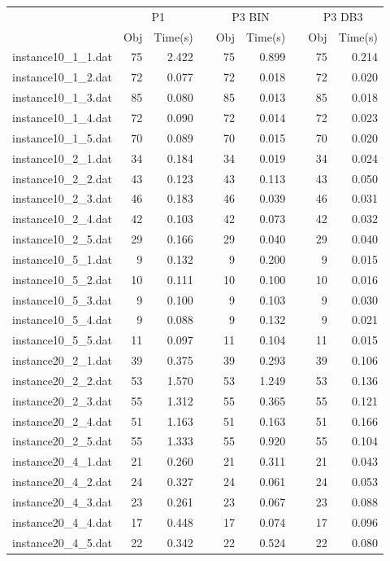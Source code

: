 \begin{table}[h!]\centering
{}
\begin{tabular}{@{}rrrcrrcrr@{}}\toprule
& \multicolumn{2}{c}{P1} & \phantom{abc} & \multicolumn{2}{c}{P3 BIN} & \phantom{abc} & \multicolumn{2}{c}{P3 DB3}\\
\cmidrule{2-3} \cmidrule{5-6} \cmidrule{8-9}
& Obj & Time(s) & & Obj & Time(s) & & Obj & Time(s)\\ \midrule
instance10\_1\_1.dat & 75 & 2.422 & & 75 & 0.899 & & 75 & 0.214 \\
instance10\_1\_2.dat & 72 & 0.077 & & 72 & 0.018 & & 72 & 0.020 \\
instance10\_1\_3.dat & 85 & 0.080 & & 85 & 0.013 & & 85 & 0.018 \\
instance10\_1\_4.dat & 72 & 0.090 & & 72 & 0.014 & & 72 & 0.023 \\
instance10\_1\_5.dat & 70 & 0.089 & & 70 & 0.015 & & 70 & 0.020 \\
instance10\_2\_1.dat & 34 & 0.184 & & 34 & 0.019 & & 34 & 0.024 \\
instance10\_2\_2.dat & 43 & 0.123 & & 43 & 0.113 & & 43 & 0.050 \\
instance10\_2\_3.dat & 46 & 0.183 & & 46 & 0.039 & & 46 & 0.031 \\
instance10\_2\_4.dat & 42 & 0.103 & & 42 & 0.073 & & 42 & 0.032 \\
instance10\_2\_5.dat & 29 & 0.166 & & 29 & 0.040 & & 29 & 0.040 \\
instance10\_5\_1.dat & 9 & 0.132 & & 9 & 0.200 & & 9 & 0.015 \\
instance10\_5\_2.dat & 10 & 0.111 & & 10 & 0.100 & & 10 & 0.016 \\
instance10\_5\_3.dat & 9 & 0.100 & & 9 & 0.103 & & 9 & 0.030 \\
instance10\_5\_4.dat & 9 & 0.088 & & 9 & 0.132 & & 9 & 0.021 \\
instance10\_5\_5.dat & 11 & 0.097 & & 11 & 0.104 & & 11 & 0.015 \\
instance20\_2\_1.dat & 39 & 0.375 & & 39 & 0.293 & & 39 & 0.106 \\
instance20\_2\_2.dat & 53 & 1.570 & & 53 & 1.249 & & 53 & 0.136 \\
instance20\_2\_3.dat & 55 & 1.312 & & 55 & 0.365 & & 55 & 0.121 \\
instance20\_2\_4.dat & 51 & 1.163 & & 51 & 0.163 & & 51 & 0.166 \\
instance20\_2\_5.dat & 55 & 1.333 & & 55 & 0.920 & & 55 & 0.104 \\
instance20\_4\_1.dat & 21 & 0.260 & & 21 & 0.311 & & 21 & 0.043 \\
instance20\_4\_2.dat & 24 & 0.327 & & 24 & 0.061 & & 24 & 0.053 \\
instance20\_4\_3.dat & 23 & 0.261 & & 23 & 0.067 & & 23 & 0.088 \\
instance20\_4\_4.dat & 17 & 0.448 & & 17 & 0.074 & & 17 & 0.096 \\
instance20\_4\_5.dat & 22 & 0.342 & & 22 & 0.524 & & 22 & 0.080 \\
\end{tabular}
\end{table}
